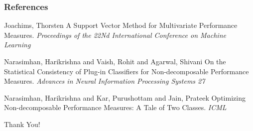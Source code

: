 \documentclass{beamer}
\begin{document}
\begin{frame}
	\frametitle{References}
	\footnotesize{
		\begin{thebibliography}{99} %
			 Joachims, Thorsten
			\newblock A Support Vector Method for Multivariate Performance Measures.
			\newblock \emph{Proceedings of the 22Nd International Conference on Machine Learning}
			
			
			 Narasimhan, Harikrishna and Vaish, Rohit and Agarwal, Shivani
			\newblock On the Statistical Consistency of Plug-in Classifiers for Non-decomposable Performance Measures.
			\newblock \emph{Advances in Neural Information Processing Systems 27}
			
			 Narasimhan, Harikrishna and Kar, Purushottam and Jain, Prateek
			\newblock Optimizing Non-decomposable Performance Measures: A Tale of Two Classes.
			\newblock \emph{ICML}
			
			
			
		\end{thebibliography}
	}
\end{frame}


\begin{frame}
	\Huge{\centerline{Thank You!}}
\end{frame}

\end{document}
